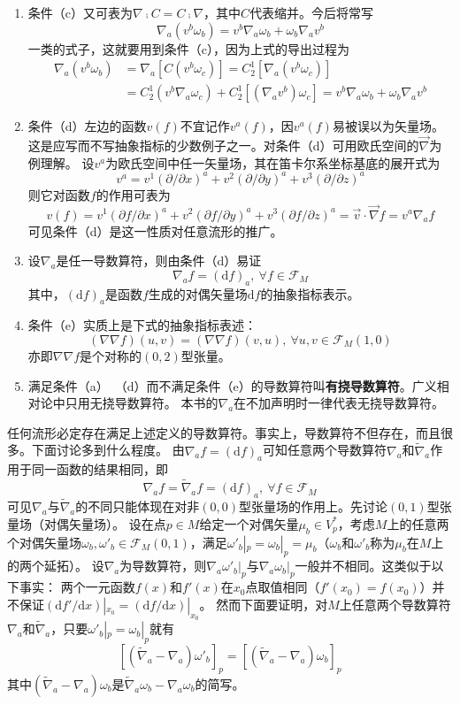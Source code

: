 \begin{note}
\begin{enumerate}[（1）]
\item 条件（c）又可表为$\nabla \comp C = C \comp \nabla$，其中$C$代表缩并。今后将常写
$$\nabla_a(v^b\omega_b) = v^b\nabla_a\omega_b + \omega_b\nabla_av^b$$
一类的式子，这就要用到条件（c），因为上式的导出过程为
$$\begin{aligned}
\nabla_a(v^b\omega_b) & = \nabla_a[C(v^b\omega_c)] = C^1_2[\nabla_a(v^b\omega_c)] \\
& = C^1_2(v^b\nabla_a\omega_c) + C^1_2[(\nabla_av^b)\omega_c] = v^b\nabla_a\omega_b + \omega_b\nabla_av^b
\end{aligned}$$
\item 条件（d）左边的函数$v(f)$不宜记作$v^a(f)$，因$v^a(f)$易被误以为矢量场。
这是应写而不写抽象指标的少数例子之一。对条件（d）可用欧氏空间的$\vec{\nabla}$为例理解。
设$v^a$为欧氏空间中任一矢量场，其在笛卡尔系坐标基底的展开式为
$$v^a = v^1(\partial / \partial x)^a + v^2(\partial / \partial y)^a + v^3(\partial / \partial z)^a$$
则它对函数$f$的作用可表为
$$v(f) = v^1(\partial f / \partial x)^a + v^2(\partial f / \partial y)^a + v^3(\partial f / \partial z)^a = \vec{v}\cdot\vec{\nabla}f = v^a\nabla_af$$
可见条件（d）是这一性质对任意流形的推广。
\item 设$\nabla_a$是任一导数算符，则由条件（d）易证
$$\nabla_af = (\mathrm{d}f)_a, ~ \forall f \in \mathscr{F}_M$$
其中，$(\mathrm{d}f)_a$是函数$f$生成的对偶矢量场$\mathrm{d}f$的抽象指标表示。
\item 条件（e）实质上是下式的抽象指标表述：
$$(\nabla\nabla f)(u, v) = (\nabla\nabla f)(v, u), ~ \forall u, v \in \mathscr{F}_M(1, 0)$$
亦即$\nabla\nabla f$是个对称的$(0, 2)$型张量。
\item 满足条件（a）~（d）而不满足条件（e）的导数算符叫\textbf{有挠导数算符}。广义相对论中只用无挠导数算符。
本书的$\nabla_a$在不加声明时一律代表无挠导数算符。
\end{enumerate}
\end{note}

任何流形必定存在满足上述定义的导数算符。事实上，导数算符不但存在，而且很多。下面讨论多到什么程度。
由$\nabla_af = (\mathrm{d}f)_a$可知任意两个导数算符$\nabla_a$和$\tilde\nabla_a$作用于同一函数的结果相同，即
$$\nabla_af = \tilde\nabla_af = (\mathrm{d}f)_a, ~ \forall f \in \mathscr{F}_M$$
可见$\nabla_a$与$\tilde\nabla_a$的不同只能体现在对非$(0, 0)$型张量场的作用上。先讨论$(0, 1)$型张量场（对偶矢量场）。
设在点$p \in M$给定一个对偶矢量$\mu_b \in V_p^*$，考虑$M$上的任意两个对偶矢量场$\omega_b, \omega'_b \in \mathscr{F}_M(0, 1)$，满足$\omega'_b|_p = \omega_b|_p = \mu_b$（$\omega_b$和$\omega'_b$称为$\mu_b$在$M$上的两个延拓）。
设$\nabla_a$为导数算符，则$\nabla_a\omega'_b|_p$与$\nabla_a\omega_b|_p$一般并不相同。这类似于以下事实：
两个一元函数$f(x)$和$f'(x)$在$x_0$点取值相同（$f'(x_0) = f(x_0)$）并不保证$(\mathrm{d}f' /\mathrm{d}x)|_{x_0} = (\mathrm{d}f /\mathrm{d}x)|_{x_0}$。
然而下面要证明，对$M$上任意两个导数算符$\nabla_a$和$\tilde\nabla_a$，只要$\omega'_b|_p = \omega_b|_p$就有
$$[(\tilde\nabla_a - \nabla_a)\omega'_b]_p = [(\tilde\nabla_a - \nabla_a)\omega_b]_p$$
其中$(\tilde\nabla_a - \nabla_a)\omega_b$是$\tilde\nabla_a\omega_b - \nabla_a\omega_b$的简写。

